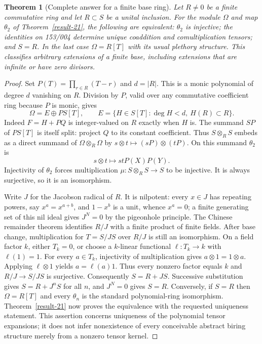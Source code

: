 \documentclass[11pt,a4paper]{article}
\newtheorem{theorem}{Theorem}[section]
\theoremstyle{definition}
\begin{document}
\begin{theorem}[Complete answer for a finite base ring]\label{result-22}
Let $R\ne0$ be a finite commutative ring and let $R\subset S$ be a
unital inclusion. For the module $\Omega$ and map $\theta_2$ of Theorem~\ref{result-21},
the following are equivalent: $\theta_2$ is injective; the identities
on 153/004 determine unique coaddition and comultiplication tensors;
and $S=R$. In the last case $\Omega=R[T]$ with its usual plethory
structure. This classifies arbitrary extensions of a finite base,
including extensions that are infinite or have zero divisors.
\end{theorem}
\begin{proof}
Set $P(T)=\prod_{r\in R}(T-r)$ and $d=|R|$. This is a monic
polynomial of degree $d$ vanishing on $R$. Division by $P$, valid over
any commutative coefficient ring because $P$ is monic, gives
\[
 \Omega=E\oplus P S[T],\qquad
 E=\{H\in S[T]:\deg H<d,\ H(R)\subset R\}.
\]
Indeed $F=H+PQ$ is integer-valued on $R$ exactly when $H$ is.
The summand $SP$ of $PS[T]$ is itself split: project $Q$ to its
constant coefficient. Thus $S\otimes_R S$ embeds as a direct summand
of $\Omega\otimes_R\Omega$ by $s\otimes t\mapsto(sP)\otimes(tP)$.
On this summand $\theta_2$ is
\[
 s\otimes t\longmapsto stP(X)P(Y).
\]
Injectivity of $\theta_2$ forces multiplication
$\mu:S\otimes_R S\to S$ to be injective. It is always surjective,
so it is an isomorphism.

Write $J$ for the Jacobson radical of $R$. It is nilpotent: every
$x\in J$ has repeating powers, say $x^a=x^{a+b}$, and $1-x^b$ is a
unit, whence $x^a=0$; a finite generating set of this nil ideal gives
$J^N=0$ by the pigeonhole principle. The Chinese remainder theorem
identifies $R/J$ with a finite product of finite fields. After base
change, multiplication for $T=S/JS$ over $R/J$ is still an
isomorphism. On a field factor $k$, either $T_k=0$, or choose a
$k$-linear functional $\ell:T_k\to k$ with $\ell(1)=1$.
For every $a\in T_k$, injectivity of multiplication gives
$a\otimes1=1\otimes a$. Applying $\ell\otimes1$ yields
$a=\ell(a)1$. Thus every nonzero factor equals $k$ and
$R/J\to S/JS$ is surjective. Consequently $S=R+JS$.
Successive substitution gives $S=R+J^nS$ for all $n$, and $J^N=0$
gives $S=R$. Conversely, if $S=R$ then $\Omega=R[T]$ and every
$\theta_n$ is the standard polynomial-ring isomorphism. Theorem~\ref{result-21} now
proves the equivalence with the requested uniqueness statement.
This assertion concerns uniqueness of the polynomial tensor
expansions; it does not infer nonexistence of every conceivable
abstract biring structure merely from a nonzero tensor kernel.
\end{proof}
\end{document}
